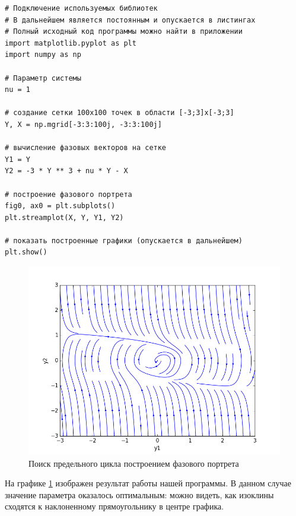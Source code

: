 \begin{program}
  \caption{Построение фазового портрета}
  \label{lab1:prog:1}
  \begin{verbatim}
# Подключение используемых библиотек
# В дальнейшем является постоянным и опускается в листингах
# Полный исходный код программы можно найти в приложении
import matplotlib.pyplot as plt
import numpy as np

# Параметр системы
nu = 1

# создание сетки 100х100 точек в области [-3;3]x[-3;3]
Y, X = np.mgrid[-3:3:100j, -3:3:100j]

# вычисление фазовых векторов на сетке
Y1 = Y
Y2 = -3 * Y ** 3 + nu * Y - X

# построение фазового портрета
fig0, ax0 = plt.subplots()
plt.streamplot(X, Y, Y1, Y2)

# показать построенные графики (опускается в дальнейшем)
plt.show()
  \end{verbatim}
\end{program}
\clearpage


\begin{figure}[thp]
  \centering
  \includegraphics[width=\textwidth]{figures/1_streamplot}
  \caption{Поиск предельного цикла построением фазового портрета}
  \label{lab1:streamplot}
\end{figure}

На графике \ref{lab1:streamplot} изображен результат работы нашей программы.
В данном случае значение параметра оказалось оптимальным: можно видеть, как
изоклины сходятся к наклоненному прямоугольнику в центре графика.

